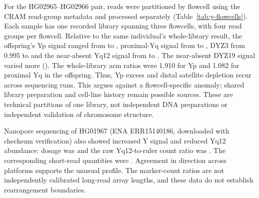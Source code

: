 For the HG02965--HG02966 pair, reads were partitioned by flowcell using the CRAM read-group metadata and processed separately (Table~\ref{tab:y-flowcells}). Each sample has one recorded library spanning three flowcells, with four read groups per flowcell. Relative to the same individual's whole-library result, the offspring's Yp signal ranged from  to , proximal-Yq signal from  to , DYZ3 from 0.995 to  and the near-absent Yq12 signal from  to . The near-absent DYZ19 signal varied more (). The whole-library arm ratios were 1.910 for Yp and 1.082 for proximal Yq in the offspring. Thus, Yp excess and distal satellite depletion recur across sequencing runs. This argues against a flowcell-specific anomaly; shared library preparation and cell-line history remain possible sources. These are technical partitions of one library, not independent DNA preparations or independent validation of chromosome structure.

Nanopore sequencing of HG01967 (ENA ERR15140186, downloaded with checksum verification) also showed increased Y signal and reduced Yq12 abundance: dosage was  and the raw Yq12-to-ruler count ratio was . The corresponding short-read quantities were . Agreement in direction across platforms supports the unusual profile. The marker-count ratios are not independently calibrated long-read array lengths, and these data do not establish rearrangement boundaries.


